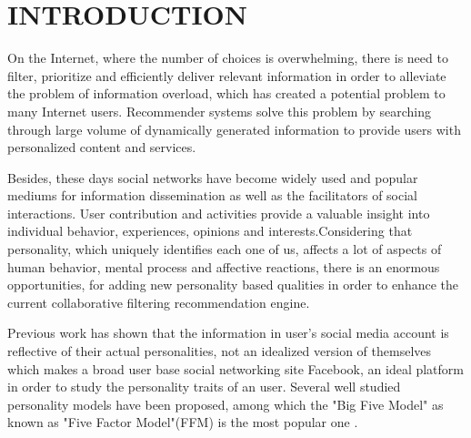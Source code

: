 \newpage
{}
\section{INTRODUCTION}
On the Internet, where the number of choices is overwhelming, there is need to filter, prioritize and efficiently deliver relevant information in order to alleviate the problem of information overload, which has created a potential problem to many Internet users. Recommender systems solve this problem by searching through large volume of dynamically generated information to provide users with personalized content and services.

Besides, these days social networks have become widely used and popular mediums for information dissemination as well as the facilitators of social interactions. User contribution and activities provide a valuable insight into individual behavior, experiences, opinions and interests.Considering that personality, which uniquely identifies each one of us, affects a lot of aspects of human behavior, mental process and affective reactions, there is an enormous opportunities, for adding new personality based qualities in order to enhance the current collaborative filtering recommendation engine.

Previous work has shown that the information in user's social media account is reflective of their actual personalities, not an idealized version of themselves which makes a broad user base social networking site Facebook, an ideal platform in order to study the personality traits of an user. Several well studied personality models have been proposed, among which the "Big Five Model" as known as "Five Factor Model"(FFM) is the most popular one \cite{fivefactormodel}.

